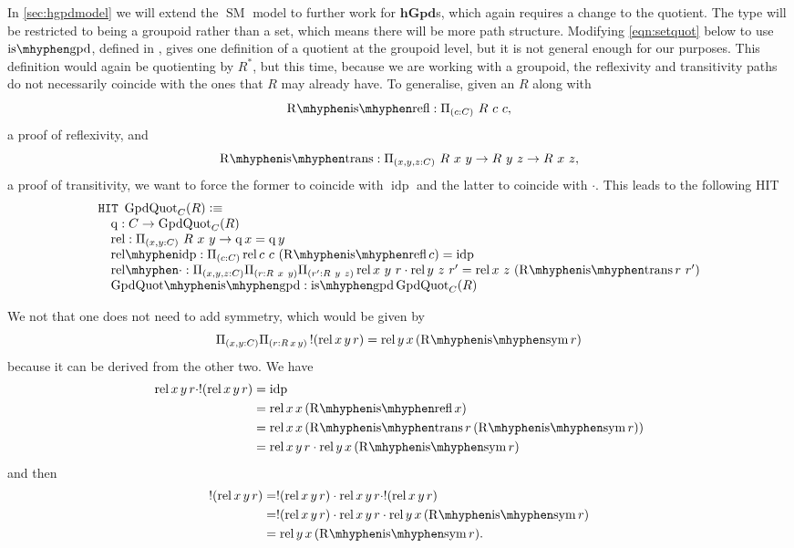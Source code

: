 \documentclass[12pt, parskip, DIV=14]{scrbook}
\newcommand{\defeq}{\vcentcolon\equiv}
\newcommand{\SM}{\operatorname{SM}}
\newcommand{\idp}{\operatorname{idp}}
\newcommand{\isgpd}{\operatorname{is\mhyphen gpd}}
\newcommand{\hGpd}{\mathbf{hGpd}}
\newcommand{\q}{\operatorname{q}}
\newcommand{\rel}{\operatorname{rel}}
\newcommand{\relidp}{\operatorname{rel\mhyphen idp}}
\newcommand{\reldot}{\operatorname{rel\mhyphen \cdot}}
\newcommand{\GpdQuot}{\operatorname{GpdQuot}_C(R)}
\newcommand{\Rrefl}{\operatorname{R\mhyphen is\mhyphen refl}}
\newcommand{\Rsym}{\operatorname{R\mhyphen is\mhyphen sym}}
\newcommand{\Rtrans}{\operatorname{R\mhyphen is\mhyphen trans}}
\begin{document}
In \cref{sec:hgpdmodel} we will extend the $\SM$ model to further work for $\hGpd$s, which again requires a change to the quotient. The type will be restricted to being a groupoid rather than a set, which means there will be more path structure. Modifying \cref{eqn:setquot} below to use $\isgpd$, defined in , gives one definition of a quotient at the groupoid level, but it is not general enough for our purposes. This definition would again be quotienting by $R^*$, but this time, because we are working with a groupoid, the reflexivity and transitivity paths do not necessarily coincide with the ones that $R$ may already have. To generalise, given an $R$ along with $$\Rrefl : \Pi_{(c : C)}~R~c~c,$$ a proof of reflexivity, and $$\Rtrans : \Pi_{(x , y , z : C)}~R~x~y \to R~y~z \to R~x~z,$$ a proof of transitivity, we want to force the former to coincide with $\idp$ and the latter to coincide with $\cdot$. This leads to the following HIT
\begin{equation}
\label{eqn:setquot}
\begin{array}{l}
  \mathtt{HIT}~\GpdQuot \defeq \\
  \quad \q : C \to \GpdQuot \\
  \quad \rel : \Pi_{(x,y : C)}~R~x~y \to \q x = \q y \\
  \quad \relidp : \Pi_{(c : C)} \rel c~c~(\Rrefl c) = \idp \\
  \quad \reldot : \Pi_{(x , y, z : C)}\Pi_{(r : R~x~y)}\Pi_{(r' : R~y~z)} \rel x~y~r \cdot \rel y~z~r' = \rel x~z~(\Rtrans r~r') \\
  \quad \mathrm{GpdQuot\mhyphen is\mhyphen gpd} : \isgpd \GpdQuot
\end{array}
\end{equation}

We not that one does not need to add symmetry, which would be given by
$$\Pi_{(x,y : C)}\Pi_{(r : R\,x\,y)}\,! (\rel x\,y\,r) = \rel y\,x\,(\Rsym r)$$
because it can be derived from the other two. We have
\begin{align*}
  \rel x\,y\,r \cdot ! (\rel x\,y\,r) &= \idp \\
  &= \rel x\,x\,(\Rrefl x) \\
  &= \rel x\,x\,(\Rtrans r\,(\Rsym r)) \\
  &= \rel x\,y\,r \cdot \rel y\,x\,(\Rsym r)
\end{align*}
and then
\begin{align*}
  ! (\rel x\,y\,r) &= ! (\rel x\,y\,r) \cdot \rel x\,y\,r \cdot ! (\rel x\,y\,r) \\
  &= ! (\rel x\,y\,r) \cdot \rel x\,y\,r \cdot \rel y\,x\,(\Rsym r) \\
  &= \rel y\,x\,(\Rsym r).
\end{align*}
\end{document}
